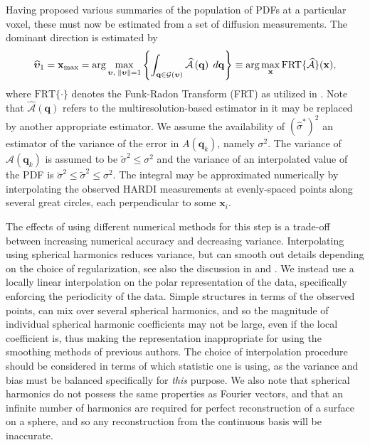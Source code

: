 \documentclass[dvips,aoas,preprint]{imsart}
\numberwithin{equation}{section}
\theoremstyle{plain}
\newcommand{\q}{\mathbf{q}}
\newcommand{\bu}{\bs{\upsilon}}
\newcommand{\x}{\mathbf{x}}
\newcommand{\cA}{\mathcal{A}}
\newcommand{\bs}[1]{\boldsymbol{#1}}
\newcommand{\wh}[1]{\widehat{#1}}
\begin{document}
Having proposed various summaries of the population of PDFs at a
particular voxel, these must now be estimated from a set of diffusion
measurements.  The dominant direction is estimated by
\begin{equation}
\label{eq:lala}
\widehat{\bu}_\text{1}= \x_\text{max}=\arg \max_{ \bu,\;\|\bu\|=1}\left\{
\int_{\q\in {\cal G}(\bu)}\widehat{\cA}\left(\q\right)\;d\q
\right\}\equiv \arg \max_{\x} \text{FRT}\{\wh\cA\}(\x),
\end{equation}
where $\text{FRT}\{\cdot\}$ denotes the Funk-Radon Transform (FRT) as
utilized in \citet{Tuch}.  Note that $\wh\cA(\q)$ refers to the
multiresolution-based estimator in \citet{OlhedeWhitcher} it may be
replaced by another appropriate estimator.  We assume the availability
of $(\wh{\sigma}^{\ast})^2$ an estimator of the variance of the error
in $A(\q_k)$, namely $\sigma^2$.  The variance of $\wh\cA(\q_k)$ is
assumed to be $\tilde{\sigma}^2\le \sigma^2$ and the variance of an
interpolated value of the PDF is
$\breve{\sigma}^2\le\tilde{\sigma}^2\le \sigma^2$.  The integral may
be approximated numerically by interpolating the observed HARDI
measurements at evenly-spaced points along several great circles, each
perpendicular to some $\x_i$.  

The effects of using different numerical methods for this step is a
trade-off between increasing numerical accuracy and decreasing
variance.  Interpolating using spherical harmonics reduces variance,
but can smooth out details depending on the choice of regularization,
see also the discussion in \citet{Descoteaux} and \citet{Hess}.  We
instead use a locally linear interpolation on the polar representation
of the data, specifically enforcing the periodicity of the data.
Simple structures in terms of the observed points, can mix over
several spherical harmonics, and so the magnitude of individual
spherical harmonic coefficients may not be large, even if the local
coefficient is, thus making the representation inappropriate for using
the smoothing methods of previous authors.  The choice of
interpolation procedure should be considered in terms of which
statistic one is using, as the variance and bias must be balanced
specifically for {\em this} purpose.  We also note that spherical
harmonics do not possess the same properties as Fourier vectors, and
that an infinite number of harmonics are required for perfect
reconstruction of a surface on a sphere, and so any reconstruction from the continuous basis will be inaccurate.
\end{document}
